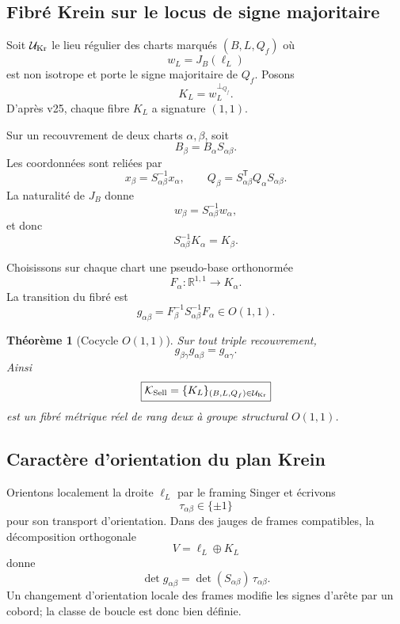 \documentclass[11pt,a4paper]{article}
\newtheorem{theorem}{Théorème}[section]
\begin{document}
\subsection{Fibré Krein sur le locus de signe majoritaire}

Soit $\mathcal U_{\rm Kr}$ le lieu régulier des charts marqués $(B,L,Q_f)$ où
\[
 w_L=J_B(\ell_L)
\]
est non isotrope et porte le signe majoritaire de $Q_f$. Posons
\[
 K_L=w_L^{\perp_{Q_f}}.
\]
D'après v25, chaque fibre $K_L$ a signature $(1,1)$.

Sur un recouvrement de deux charts $\alpha,\beta$, soit
\[
 B_\beta=B_\alpha S_{\alpha\beta}.
\]
Les coordonnées sont reliées par
\[
 x_\beta=S_{\alpha\beta}^{-1}x_\alpha,
\qquad
 Q_\beta=S_{\alpha\beta}^{\mathsf T}Q_\alpha S_{\alpha\beta}.
\]
La naturalité de $J_B$ donne
\[
 w_\beta=S_{\alpha\beta}^{-1}w_\alpha,
\]
et donc
\[
 \boxed{
 S_{\alpha\beta}^{-1}K_\alpha=K_\beta.}
\]

Choisissons sur chaque chart une pseudo-base orthonormée
\[
 F_\alpha:\mathbb R^{1,1}\longrightarrow K_\alpha.
\]
La transition du fibré est
\begin{equation}\label{eq:v26-Krein-transition}
 \boxed{
 g_{\alpha\beta}
 =
 F_\beta^{-1}
 S_{\alpha\beta}^{-1}
 F_\alpha
 \in O(1,1).}
\end{equation}

\begin{theorem}[Cocycle $O(1,1)$]\label{thm:v26-Krein-cocycle}
Sur tout triple recouvrement,
\[
 \boxed{
 g_{\beta\gamma}g_{\alpha\beta}
 =
 g_{\alpha\gamma}.}
\]
Ainsi
\[
 \boxed{
 \mathcal K_{\rm Sell}
 =
 \{K_L\}_{(B,L,Q_f)\in\mathcal U_{\rm Kr}}
}
\]
est un fibré métrique réel de rang deux à groupe structural $O(1,1)$.
\end{theorem}

\subsection{Caractère d'orientation du plan Krein}

Orientons localement la droite $\ell_L$ par le framing Singer et écrivons
\[
 \tau_{\alpha\beta}\in\{\pm1\}
\]
pour son transport d'orientation. Dans des jauges de frames compatibles, la décomposition orthogonale
\[
 V=\ell_L\oplus K_L
\]
donne
\begin{equation}\label{eq:v26-detK}
 \boxed{
 \det g_{\alpha\beta}
 =
 \det(S_{\alpha\beta})\,\tau_{\alpha\beta}.}
\end{equation}
Un changement d'orientation locale des frames modifie les signes d'arête par un cobord; la classe de boucle est donc bien définie.
\end{document}
